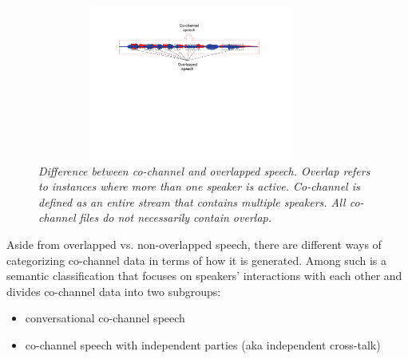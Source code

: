 \begin{figure}[h!]
	\centering
	\vspace{0mm}
	\includegraphics[height = 2in, width=0.9\textwidth]{figures/cochannel_vs_overlap-crop}
	\vspace{-3mm}
	\caption{\it \small Difference between co-channel and overlapped speech. Overlap refers to instances where more than one speaker is active. Co-channel is defined as an entire stream that contains multiple speakers. All co-channel files do not necessarily contain overlap. }
	\label{fig:cochannel_vs_overlap}
	\vspace{-3mm}
\end{figure}



Aside from overlapped vs. non-overlapped speech, there are different ways of categorizing co-channel data in terms of how it is generated. 
Among such is a semantic classification that focuses on speakers' interactions with each other and divides co-channel data into two subgroups: 
\begin{itemize}
	\item conversational co-channel speech
	\item co-channel speech with independent parties (aka independent cross-talk)
\end{itemize} 

